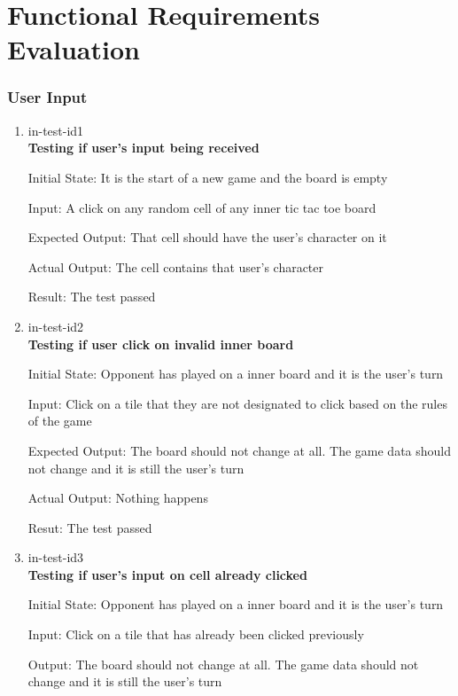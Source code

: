 \documentclass[12pt, titlepage]{article}
\begin{document}
\section{Functional Requirements Evaluation}
\subsubsection{User Input}

\begin{enumerate}

\item{in-test-id1\\}
\textbf {Testing if user's input being received}
					
Initial State: It is the start of a new game and the board is empty
					
Input: A click on any random cell of any inner tic tac toe board
					
Expected Output: That cell should have the user's character on it

Actual Output: The cell contains that user's character

Result: The test passed
					
\item{in-test-id2\\}
\textbf{Testing if user click on invalid inner board}
					
Initial State: Opponent has played on a inner board and it is the user's turn

Input: Click on a tile that they are not designated to click based on the
rules of the game
					
Expected Output: The board should not change at all. The game data should not change
and it is still the user's turn

Actual Output: Nothing happens

Resut: The test passed

\item{in-test-id3\\}
\textbf{Testing if user's input on cell already clicked}
					
Initial State: Opponent has played on a inner board and it is the user's turn
					
Input: Click on a tile that has already been clicked previously
					
Output: The board should not change at all. The game data should not change
and it is still the user's turn

\end{enumerate}
\end{document}
